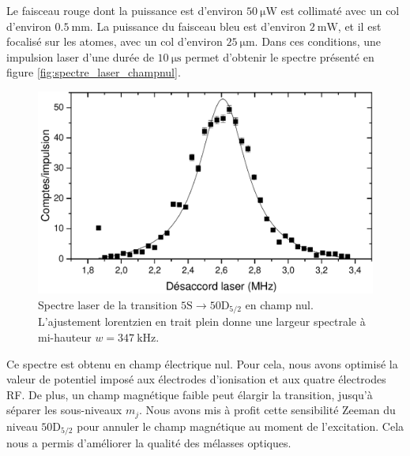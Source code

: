 Le faisceau rouge dont la puissance est d'environ $\SI{50}{\micro\watt}$ est collimaté avec un col d'environ $\SI{0.5}{\mm}$.
La puissance du faisceau bleu est d'environ $\SI{2}{\milli\watt}$, et il est focalisé sur les atomes, avec un col d'environ $\SI{25}{\um}$.
Dans ces conditions, une impulsion laser d'une durée de $\SI{10}{\us}$ permet d'obtenir le spectre présenté en figure \eqref{fig:spectre_laser_champnul}.
%
\begin{figure}[!h]
\centering
\includegraphics[width=0.85\linewidth]{figures/circulars/spectre_laser_champnul}
\caption[Spectre laser de la transition $\mathrm{5S\rightarrow 50D_{5/2}}$ en champ nul]{
Spectre laser de la transition $\mathrm{5S\rightarrow 50D_{5/2}}$ en champ nul.
L'ajustement lorentzien en trait plein donne une largeur spectrale à mi-hauteur $w =\SI{347}{\kHz}$.
}
\label{fig:spectre_laser_champnul}
\end{figure}

Ce spectre est obtenu en champ électrique nul.
Pour cela, nous avons optimisé la valeur de potentiel imposé aux électrodes d'ionisation et aux quatre électrodes RF.
De plus, un champ magnétique faible peut élargir la transition, jusqu'à séparer les sous-niveaux $m_j$.
Nous avons mis à profit cette sensibilité Zeeman du niveau $\mathrm{50D_{5/2}}$ pour annuler le champ magnétique au moment de l'excitation.
Cela nous a permis d'améliorer la qualité des mélasses optiques.
		
